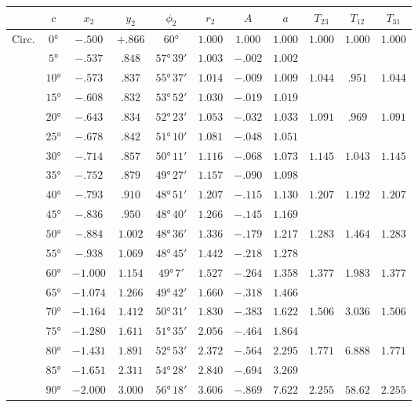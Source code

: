 \documentclass[11pt,a4paper]{article}
\theoremstyle{definition}
\begin{document}
\begin{center}
\small
\begin{tabular}{|l|c|c|c|c|c|c|c|c|c|c|}
\hline
 & $c$ & $x_2$ & $y_2$ & $\phi_2$ & $r_2$ & $A$ & $a$ & $T_{23}$ & $T_{12}$ & $T_{31}$ \\
\hline
Circ. & $0°$ & $-.500$ & $+.866$ & $60°$ & $1.000$ & $1.000$ & $1.000$ & $1.000$ & $1.000$ & $1.000$ \\
 & $5°$ & $-.537$ & $.848$ & $57°\,39'$ & $1.003$ & $-.002$ & $1.002$ & & & \\
 & $10°$ & $-.573$ & $.837$ & $55°\,37'$ & $1.014$ & $-.009$ & $1.009$ & $1.044$ & $.951$ & $1.044$ \\
 & $15°$ & $-.608$ & $.832$ & $53°\,52'$ & $1.030$ & $-.019$ & $1.019$ & & & \\
 & $20°$ & $-.643$ & $.834$ & $52°\,23'$ & $1.053$ & $-.032$ & $1.033$ & $1.091$ & $.969$ & $1.091$ \\
 & $25°$ & $-.678$ & $.842$ & $51°\,10'$ & $1.081$ & $-.048$ & $1.051$ & & & \\
 & $30°$ & $-.714$ & $.857$ & $50°\,11'$ & $1.116$ & $-.068$ & $1.073$ & $1.145$ & $1.043$ & $1.145$ \\
 & $35°$ & $-.752$ & $.879$ & $49°\,27'$ & $1.157$ & $-.090$ & $1.098$ & & & \\
 & $40°$ & $-.793$ & $.910$ & $48°\,51'$ & $1.207$ & $-.115$ & $1.130$ & $1.207$ & $1.192$ & $1.207$ \\
 & $45°$ & $-.836$ & $.950$ & $48°\,40'$ & $1.266$ & $-.145$ & $1.169$ & & & \\
 & $50°$ & $-.884$ & $1.002$ & $48°\,36'$ & $1.336$ & $-.179$ & $1.217$ & $1.283$ & $1.464$ & $1.283$ \\
 & $55°$ & $-.938$ & $1.069$ & $48°\,45'$ & $1.442$ & $-.218$ & $1.278$ & & & \\
 & $60°$ & $-1.000$ & $1.154$ & $49°\,7'$ & $1.527$ & $-.264$ & $1.358$ & $1.377$ & $1.983$ & $1.377$ \\
 & $65°$ & $-1.074$ & $1.266$ & $49°\,42'$ & $1.660$ & $-.318$ & $1.466$ & & & \\
 & $70°$ & $-1.164$ & $1.412$ & $50°\,31'$ & $1.830$ & $-.383$ & $1.622$ & $1.506$ & $3.036$ & $1.506$ \\
 & $75°$ & $-1.280$ & $1.611$ & $51°\,35'$ & $2.056$ & $-.464$ & $1.864$ & & & \\
 & $80°$ & $-1.431$ & $1.891$ & $52°\,53'$ & $2.372$ & $-.564$ & $2.295$ & $1.771$ & $6.888$ & $1.771$ \\
 & $85°$ & $-1.651$ & $2.311$ & $54°\,28'$ & $2.840$ & $-.694$ & $3.269$ & & & \\
 & $90°$ & $-2.000$ & $3.000$ & $56°\,18'$ & $3.606$ & $-.869$ & $7.622$ & $2.255$ & $58.62$ & $2.255$ \\
\hline
\end{tabular}
\end{center}
\end{document}
